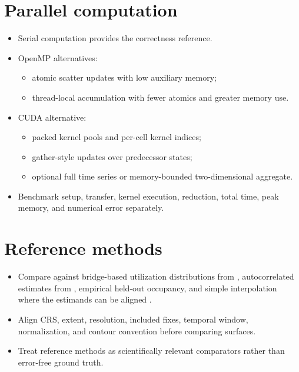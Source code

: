 \section{Parallel computation}

\begin{itemize}
  \item Serial computation provides the correctness reference.
  \item OpenMP alternatives:
  \begin{itemize}
    \item atomic scatter updates with low auxiliary memory;
    \item thread-local accumulation with fewer atomics and greater memory use.
  \end{itemize}
  \item CUDA alternative:
  \begin{itemize}
    \item packed kernel pools and per-cell kernel indices;
    \item gather-style updates over predecessor states;
    \item optional full time series or memory-bounded two-dimensional aggregate.
  \end{itemize}
  \item Benchmark setup, transfer, kernel execution, reduction, total time, peak memory, and numerical error separately.
\end{itemize}

\section{Reference methods}

\begin{itemize}
  \item Compare against bridge-based utilization distributions from , autocorrelated estimates from , empirical held-out occupancy, and simple interpolation where the estimands can be aligned \parencite{calabrese2016ctmm}.
  \item Align CRS, extent, resolution, included fixes, temporal window, normalization, and contour convention before comparing surfaces.
  \item Treat reference methods as scientifically relevant comparators rather than error-free ground truth.
\end{itemize}
